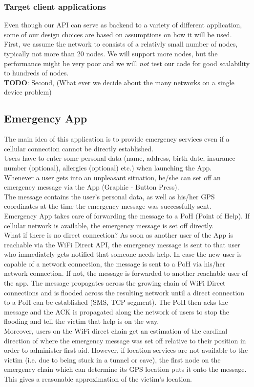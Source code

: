 \subsubsection{Target client applications}
	Even though our API can serve as backend to a variety of different application, some of our design choices are based on assumptions on how it will be used. \\
	First, we assume the network to consists of a relativly small number of nodes, typically not more than 20 nodes. We will support more nodes, but the performance might be very poor and we will \textit{not} test our code for good scalability to hundreds of nodes. \\
	\textbf{TODO}: Second, (What ever we decide about the many networks on a single device problem)
		
\subsection{Emergency App}
The main idea of this application is to provide emergency services even if a cellular connection cannot be directly established. \\
Users have to enter some personal data (name, address, birth date, insurance number (optional), allergies (optional) etc.) when launching the App. \\
Whenever a user gets into an unpleasant situation, he/she can set off an emergency message via the App (Graphic - Button Press). \\
The message contains the user's personal data, as well as his/her GPS coordinates at the time the emergency message was successfully sent. \\
Emergency App takes care of forwarding the message to a PoH (Point of Help). If cellular network is available, the emergency message is set off directly. \\
What if there is no direct connection? As soon as another user of the App is reachable via the WiFi Direct API, the emergency message is sent to that user who immediately gets notified that someone needs help. In case the new user is capable of a network connection, the message is sent to a PoH via his/her network connection. If not, the message is forwarded to another reachable user of the app. The message propagates across the growing chain of WiFi Direct connections and is flooded across the resulting network until a direct connection to a PoH can be established (SMS, TCP segment). The PoH then acks the message and the ACK is propagated along the network of users to stop the flooding and tell the victim that help is on the way. \\
Moreover, users on the WiFi direct chain get an estimation of the cardinal direction of where the emergency message was set off relative to their position in order to administer first aid.
However, if location services are not available to the victim (i.e. due to being stuck in a tunnel or cave), the first node on the emergency chain which can determine its GPS location puts it onto the message. This gives a reasonable approximation of the victim's location. \\
		
